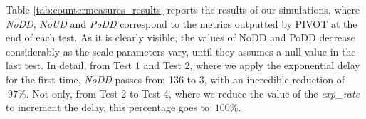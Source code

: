 Table \ref{tab:countermeasures_results} reports the results of our simulations, where \textit{NoDD}, \textit{NoUD} and \textit{PoDD} correspond to the metrics outputted by PIVOT at the end of each test. As it is clearly visible, the values of NoDD and PoDD decrease considerably as the scale parameters vary, until they assumes a null value in the last test. In detail, from Test 1 and Test 2, where we apply the exponential delay for the first time, \textit{NoDD} passes from 136 to 3, with an incredible reduction of \(\ 97\% \). Not only, from Test 2 to Test 4, where we reduce the value of the \textit{exp\_rate} to increment the delay, this percentage goes to \(\ 100\% \). 